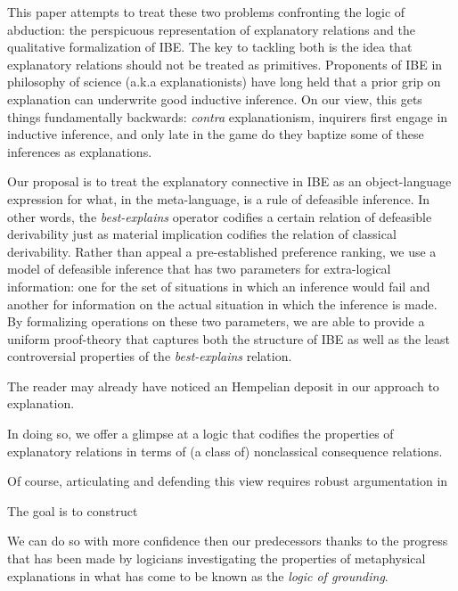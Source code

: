 \documentclass{article}
\theoremstyle{definition}
\theoremstyle{definition}
\theoremstyle{definition}
\theoremstyle{definition}
\theoremstyle{remark}
\theoremstyle{definition}
\theoremstyle{definition}
\begin{document}
This paper attempts to treat these two problems confronting the logic of abduction: the perspicuous representation of explanatory relations and the qualitative formalization of IBE. The key to tackling both is the idea that explanatory relations should not be treated as primitives. Proponents of IBE in philosophy of science (a.k.a explanationists) have long held that a prior grip on explanation can underwrite good inductive inference. On our view, this  gets things fundamentally backwards: \textit{contra} explanationism, inquirers first engage in inductive inference, and only late in the game do they baptize some of these inferences as explanations. 

Our proposal is to treat the explanatory connective in IBE as an object-language expression for what, in the meta-language, is a rule of defeasible inference. In other words, the \textit{best-explains} operator codifies a certain relation of defeasible derivability just as material implication codifies the relation of classical derivability.  Rather than appeal a pre-established preference ranking, we use a model of defeasible inference that has two parameters for extra-logical information: one for the set of situations in which an inference would fail and another for information on the actual situation in which the inference is made. By formalizing operations on these two parameters, we are able to provide a uniform proof-theory that captures both the structure of IBE as well as the least controversial properties of the \textit{best-explains} relation.

The reader may already have noticed an Hempelian deposit in our approach to explanation.  





 In doing so, we offer a glimpse at a logic that codifies the properties of explanatory relations in terms of (a class of) nonclassical consequence relations.


Of course, articulating and defending this view requires robust argumentation in




The goal is to construct  

We can do so with more confidence then our predecessors thanks to the progress that has been made by logicians investigating the properties of metaphysical explanations in what has come to be known as the \textit{logic of grounding}.
 
\end{document}
